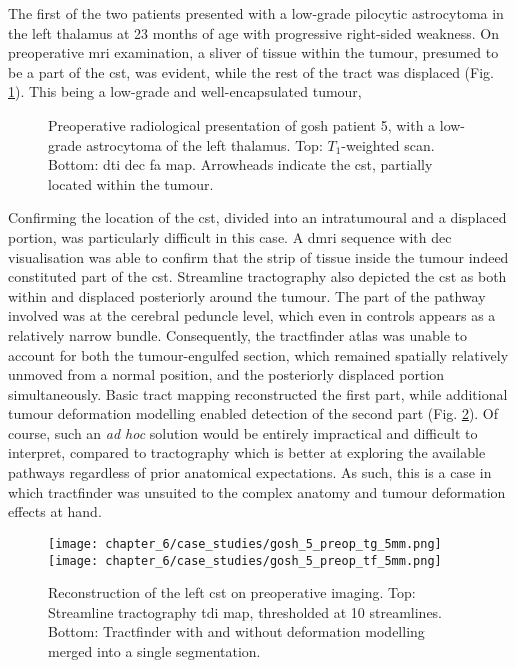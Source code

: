 The first of the two patients presented with a low-grade pilocytic astrocytoma in the left thalamus at 23 months of age with progressive right-sided weakness.
On preoperative \gls{mri} examination, a sliver of tissue within the tumour, presumed to be a part of the \gls{cst}, was evident, while the rest of the tract was displaced (Fig. \ref{fig:5p}).
This being a low-grade and well-encapsulated tumour,

\begin{figure}[htb!]
  \centering
  
  
  \caption{Preoperative radiological presentation of \gls{gosh} patient 5, with a low-grade astrocytoma of the left thalamus. Top: $T_1$-weighted scan. Bottom: \gls{dti} \gls{dec} \gls{fa} map. Arrowheads indicate the \gls{cst}, partially located within the tumour.}
  \label{fig:5p}
\end{figure}

Confirming the location of the \gls{cst}, divided into an intratumoural and a displaced portion, was particularly difficult in this case.
A \gls{dmri} sequence with \gls{dec} visualisation was able to confirm that the strip of tissue inside the tumour indeed constituted part of the \gls{cst}.
Streamline tractography also depicted the \gls{cst} as both within and displaced posteriorly around the tumour.
The part of the pathway involved was at the cerebral peduncle level, which even in controls appears as a relatively narrow bundle.
Consequently, the tractfinder atlas was unable to account for both the tumour-engulfed section, which remained spatially relatively unmoved from a normal position, and the posteriorly displaced portion simultaneously.
Basic tract mapping reconstructed the first part, while additional tumour deformation modelling enabled detection of the second part (Fig. \ref{fig:5p_cst}).
Of course, such an \textit{ad hoc} solution would be entirely impractical and difficult to interpret, compared to tractography which is better at exploring the available pathways regardless of prior anatomical expectations.
As such, this is a case in which tractfinder was unsuited to the complex anatomy and tumour deformation effects at hand.

\begin{figure}[htb!]
  \centering
  \texttt{[image: chapter\_6/case\_studies/gosh\_5\_preop\_tg\_5mm.png]}
  \texttt{[image: chapter\_6/case\_studies/gosh\_5\_preop\_tf\_5mm.png]}
  \caption{Reconstruction of the left \gls{cst} on preoperative imaging. Top: Streamline tractography \gls{tdi} map, thresholded at 10 streamlines. Bottom: Tractfinder with and without deformation modelling merged into a single segmentation.}
  \label{fig:5p_cst}
\end{figure}

